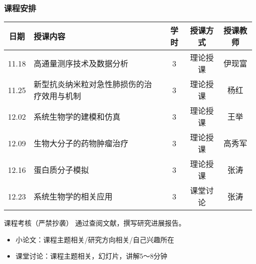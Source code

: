 \begin{frame}
  \frametitle{课程安排}
  \begin{table}
    \centering
    \begin{tabular}{clccc}
      \hline
      \rowcolor{blue!50}日期 & 授课内容 & 学时 & 授课方式 & 授课教师\\
      \hline
      11.18 & 高通量测序技术及数据分析 & 3 & 理论授课 & 伊现富\\
      11.25 & \tiny{新型抗炎纳米粒对急性肺损伤的治疗效用与机制} & 3 & 理论授课 & 杨红\\
      12.02 & 系统生物学的建模和仿真 & 3 & 理论授课 & 王举\\
      12.09 & 生物大分子的药物肿瘤治疗 & 3 & 理论授课 & 高秀军\\
      12.16 & 蛋白质分子模拟 & 3 & 理论授课 & 张涛\\
      12.23 & 系统生物学的相关应用 & 3 & 课堂讨论 & 张涛\\
      \hline
    \end{tabular}
  \end{table}
  \vspace{-1em}
  \begin{block}{课程考核（\alert{严禁抄袭}）}
    通过查阅文献，撰写研究进展报告。
    \begin{itemize}
      \item 小论文：课程主题相关/研究方向相关/自己兴趣所在
      \item 课堂讨论：课程主题相关，幻灯片，讲解5～8分钟
    \end{itemize}
  \end{block}
\end{frame}
